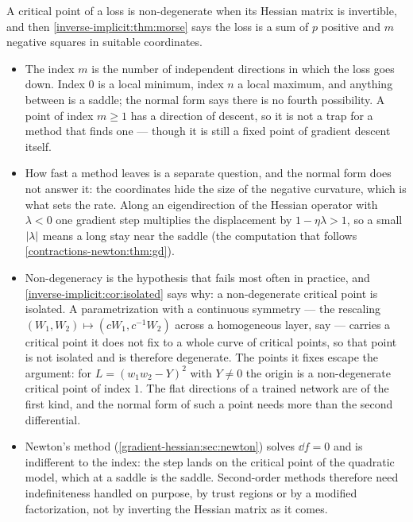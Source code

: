 \begin{notechapter}
\begin{mlthread}
A critical point of a loss is non-degenerate when its Hessian matrix is
invertible, and then \cref{inverse-implicit:thm:morse} says the loss is
a sum of $p$ positive and $m$ negative squares in suitable coordinates.
\begin{itemize}[nosep]
  \item The index $m$ is the number of independent directions in which
        the loss goes down. Index $0$ is a local minimum, index $n$ a
        local maximum, and anything between is a saddle; the normal form
        says there is no fourth possibility. A point of index $m\geq1$
        has a direction of descent, so it is not a trap for a method
        that finds one --- though it is still a fixed point of gradient
        descent itself.
  \item How fast a method leaves is a separate question, and the normal
        form does not answer it: the coordinates hide the size of the
        negative curvature, which is what sets the rate. Along an
        eigendirection of the Hessian operator with $\lambda < 0$ one
        gradient step multiplies the displacement by
        $1 - \eta\lambda > 1$, so a small $\left|\lambda\right|$ means a long
        stay near the saddle (the computation that follows
        \cref{contractions-newton:thm:gd}).
  \item Non-degeneracy is the hypothesis that fails most often in
        practice, and \cref{inverse-implicit:cor:isolated} says why: a
        non-degenerate critical point is isolated. A parametrization
        with a continuous symmetry --- the rescaling
        $(W_1, W_2)\mapsto(cW_1, c^{-1}W_2)$ across a homogeneous
        layer, say --- carries a critical point it does not fix to a
        whole curve of critical points, so that point is not isolated
        and is therefore degenerate. The points it fixes escape the
        argument: for $L = (w_1w_2 - Y)^2$ with $Y\neq0$ the origin is
        a non-degenerate critical point of index $1$. The flat
        directions of a trained network are of the first kind, and the
        normal form of such a point needs more than the second
        differential.
  \item Newton's method (\cref{gradient-hessian:sec:newton}) solves
        $\dd f = 0$ and is indifferent to the index: the step lands on
        the critical point of the quadratic model, which at a saddle is
        the saddle. Second-order methods therefore need indefiniteness
        handled on purpose, by trust regions or by a modified
        factorization, not by inverting the Hessian matrix as it comes.
\end{itemize}
\end{mlthread}


\end{notechapter}
